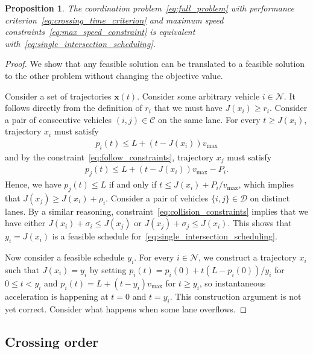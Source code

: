 \documentclass[a4paper]{article}
\theoremstyle{definition}
\theoremstyle{plain}
\newtheorem{proposition}{Proposition}
\begin{document}
\begin{proposition}
  The coordination problem~\eqref{eq:full_problem} with performance criterion~\eqref{eq:crossing_time_criterion} and maximum speed
  constraints~\eqref{eq:max_speed_constraint} is equivalent with~\eqref{eq:single_intersection_scheduling}.
\end{proposition}
\begin{proof}
  We show that any feasible solution can be translated to a feasible solution to
  the other problem without changing the objective value.

  Consider a set of trajectories $\mathbf{x}(t)$. Consider some arbitrary
  vehicle $i \in \mathcal{N}$. It follows directly from the definition of $r_{i}$
  that we must have $J(x_{i}) \geq r_{i}$.
  Consider a pair of consecutive vehicles $(i,j) \in \mathcal{C}$ on the same
  lane. For every $t \geq J(x_{i})$, trajectory $x_{i}$ must satisfy
  \begin{align*}
    p_{i}(t) \leq L + (t - J(x_{i})) v_{\text{max}}
  \end{align*}
  and by the constraint~\eqref{eq:follow_constraints}, trajectory $x_{j}$ must satisfy
  \begin{align*}
    p_{j}(t) \leq L + (t - J(x_{i})) v_{\text{max}} - P_{i} .
  \end{align*}
  Hence, we have $p_{j}(t) \leq L$ if and only if
  $t \leq J(x_{i}) + P_{i} / v_{\text{max}}$, which implies that
  $J(x_{j}) \geq J(x_{i}) + \rho_{i}$.
  Consider a pair of vehicles $\{i, j\} \in \mathcal{D}$ on distinct lanes. By a
  similar reasoning, constraint~\eqref{eq:collision_constraints} implies that we have either
  $J(x_{i}) + \sigma_{i} \leq J(x_{j})$ or $J(x_{j}) + \sigma_{j} \leq J(x_{i})$.
  This shows that $y_{i} = J(x_{i})$ is a feasible schedule for~\eqref{eq:single_intersection_scheduling}.

  Now consider a feasible schedule $y_{i}$. For every $i \in \mathcal{N}$, we
  construct a trajectory $x_{i}$ such that $J(x_{i}) = y_{i}$ by setting
  $p_{i}(t) = p_{i}(0) + t (L - p_{i}(0)) / y_{i}$ for $0 \leq t < y_{i}$ and
  $p_{i}(t) = L + (t - y_{i}) v_{\text{max}}$ for $t \geq y_{i}$, so
  instantaneous acceleration is happening at $t=0$ and $t=y_{i}$.
  {\color{blue} This construction argument is not yet correct. Consider what happens when some lane overflows.}
\end{proof}


\subsection*{Crossing order}
\end{document}
